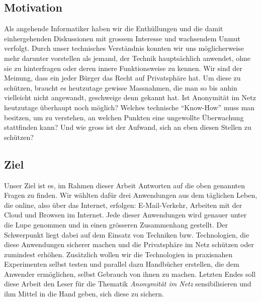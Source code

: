 \subsection{Motivation}
Als angehende Informatiker haben wir die Enthüllungen und die damit einhergehenden Diskussionen mit grossem Interesse und wachsendem Unmut verfolgt. Durch unser technisches Verständnis konnten wir uns möglicherweise mehr darunter vorstellen als jemand, der Technik hauptsächlich anwendet, ohne sie zu hinterfragen oder deren innere Funktionsweise zu kennen. Wir sind der Meinung, dass ein jeder Bürger das Recht auf Privatsphäre hat. Um diese zu schützen, braucht es heutzutage gewisse Massnahmen, die man so bis anhin vielleicht nicht angewandt, geschweige denn gekannt hat. Ist Anonymität im Netz heutzutage überhaupt noch möglich? Welches technische ``Know-How'' muss man besitzen, um zu verstehen, an welchen Punkten eine ungewollte Überwachung stattfinden kann? Und wie gross ist der Aufwand, sich an eben diesen Stellen zu schützen?

\subsection{Ziel}
Unser Ziel ist es, im Rahmen dieser Arbeit Antworten auf die oben genannten Fragen zu finden. Wir wählten dafür drei Anwendungen aus dem täglichen Leben, die online, also über das Internet, erfolgen: E-Mail-Verkehr, Arbeiten mit der Cloud und Browsen im Internet. Jede dieser Anwendungen wird genauer unter die Lupe genommen und in einen grösseren Zusammenhang gestellt. Der Schwerpunkt liegt dabei auf dem Einsatz von Techniken bzw. Technologien, die diese Anwendungen sicherer machen und die Privatsphäre im Netz schützen oder zumindest erhöhen. Zusätzlich wollen wir die Technologien in praxisnahen Experimenten selbst testen und parallel dazu Handbücher erstellen, die dem Anwender ermöglichen, selbst Gebrauch von ihnen zu machen. Letzten Endes soll diese Arbeit den Leser für die Thematik \textit{Anonymität im Netz} sensibilisieren und ihm Mittel in die Hand geben, sich diese zu sichern.
